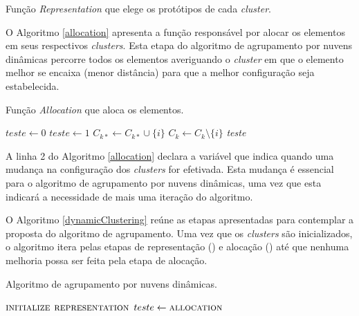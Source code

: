 \begin{algorithm}[htb]
\caption{Função \emph{Representation} que elege os protótipos de cada \emph{cluster}.}
\label{representation}
	\begin{algorithmic}[1]
			\EndFor			
		\EndFunction
	\end{algorithmic}
\end{algorithm}

O Algoritmo \ref{allocation} apresenta a função responsável por alocar os elementos em seus respectivos \emph{clusters}. Esta etapa do algoritmo de agrupamento por nuvens dinâmicas percorre todos os elementos averiguando o \emph{cluster} em que o elemento melhor se encaixa (menor distância) para que a melhor configuração seja estabelecida.

\begin{algorithm}[htb]
\caption{Função \emph{Allocation} que aloca os elementos.}
\label{allocation}
	\begin{algorithmic}[1]
			\State $teste \gets 0$
						\State $teste \gets 1$
						\State $C_{k*} \gets C_{k*} \cup \{i\}$
						\State $C_k \gets C_k \setminus \{i\}$
					\EndIf	
			\EndFor
			\State \Return \emph{teste}
		\EndFunction
	\end{algorithmic}
\end{algorithm}

A linha 2 do Algoritmo \ref{allocation} declara a variável que indica quando uma mudança na configuração dos \emph{clusters} for efetivada. Esta mudança é essencial para o algoritmo de agrupamento por nuvens dinâmicas, uma vez que esta indicará a necessidade de mais uma iteração do algoritmo.

O Algoritmo \ref{dynamicClustering} reúne as etapas apresentadas para contemplar a proposta do algoritmo de agrupamento. Uma vez que os \emph{clusters} são inicializados, o algoritmo itera pelas etapas de representação () e alocação () até que nenhuma melhoria possa ser feita pela etapa de alocação.

\begin{algorithm}[htb]
\caption{Algoritmo de agrupamento por nuvens dinâmicas.}
\label{dynamicClustering}
	\begin{algorithmic}[1]
		
			\State $\Call{initialize}{}$
			\Repeat
				\State $\Call{representation}{}$
				\State $teste \gets \Call{allocation}{}$
		\EndFunction
	\end{algorithmic}
\end{algorithm}

